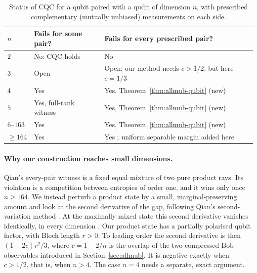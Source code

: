 \documentclass[11pt,a4paper]{article}
\numberwithin{equation}{section}
\theoremstyle{remark}\newtheorem{remark}[theorem]{Remark}
\begin{document}
\begin{table}[ht]
\centering\small
\caption{Status of CQC for a qubit paired with a qudit of dimension $n$, with prescribed complementary (mutually unbiased) measurements on each side.}
\label{tab:status}
\begin{tabular}{>{\raggedright\arraybackslash}p{}>{\raggedright\arraybackslash}p{}>{\raggedright\arraybackslash}p{}}
\toprule
$n$ & Fails for some pair? & Fails for every prescribed pair?\\
\midrule
$2$ & No: CQC holds \cite{wangqubits} & No\\
$3$ & Open \cite[Section~11(1)]{qian} & Open; our method needs $c>1/2$, but here $c=1/3$\\
$4$ & Yes \cite[Theorem~5.1]{qian} & Yes, Theorem~\ref{thm:allmub-qubit} (new)\\
$5$ & Yes, full-rank witness \cite[Theorem~7.7]{qian} & Yes, Theorem~\ref{thm:allmub-qubit} (new)\\
$6$--$163$ & Yes \cite[Theorem~5.1]{qian} & Yes, Theorem~\ref{thm:allmub-qubit} (new)\\
$\ge164$ & Yes & Yes \cite[Theorem~4.1]{qian}; uniform separable margin added here\\
\bottomrule
\end{tabular}
\end{table}

\paragraph{Why our construction reaches small dimensions.}
Qian's every-pair witness is a fixed equal mixture of two pure product rays. Its violation is a competition between entropies of order one, and it wins only once $n\ge164$. We instead perturb a product state by a small, marginal-preserving amount and look at the second derivative of the gap, following Qian's second-variation method \cite[Section~7]{qian}. At the maximally mixed state this second derivative vanishes identically, in every dimension \cite[Remark~7.5]{qian}. Our product state has a partially polarised qubit factor, with Bloch length $r>0$. To leading order the second derivative is then $(1-2c)r^2/3$, where $c=1-2/n$ is the overlap of the two compressed Bob observables introduced in Section~\ref{sec:allmub}. It is negative exactly when $c>1/2$, that is, when $n>4$. The case $n=4$ needs a separate, exact argument.
\end{document}
